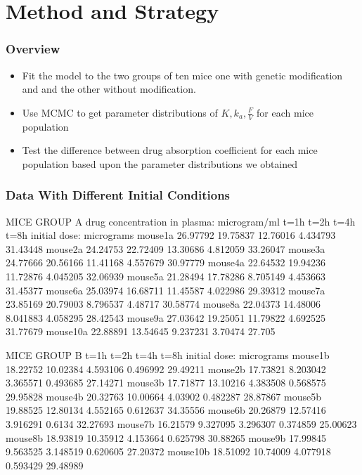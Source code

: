 \documentclass[t]{beamer}
\begin{document}
\section{Method and Strategy}
\begin{frame}[c]
\frametitle{Overview}

\begin{itemize}
\item Fit the model to the two groups of ten mice one with genetic modification and and the other without modification.
\pause
\item Use MCMC to get parameter distributions of  $K, k_{a}, \frac{F}{V}$ for each mice population
\pause
\item Test the difference between drug absorption coefficient for each mice population based upon the parameter distributions we obtained
\end{itemize}
\end{frame}

\begin{frame}[fragile]
  \frametitle{Data With Different Initial Conditions}
\begin{semiverbatim}
{\tiny
MICE GROUP A
drug concentration in plasma: microgram/ml
         t=1h     t=2h     t=4h     t=8h            initial dose: micrograms
mouse1a  26.97792 19.75837 12.76016 4.434793     \alert<2->{   31.43448}
mouse2a  24.24753 22.72409 13.30686 4.812059     \alert<2->{   33.26047}
mouse3a  24.77666 20.56166 11.41168 4.557679     \alert<2->{   30.97779}
mouse4a  22.64532 19.94236 11.72876 4.045205     \alert<2->{   32.06939}
mouse5a  21.28494 17.78286 8.705149 4.453663     \alert<2->{   31.45377}
mouse6a  25.03974 16.68711 11.45587 4.022986     \alert<2->{   29.39312}
mouse7a  23.85169 20.79003 8.796537 4.48717      \alert<2->{   30.58774}
mouse8a  22.04373 14.48006 8.041883 4.058295     \alert<2->{   28.42543}
mouse9a  27.03642 19.25051 11.79822 4.692525     \alert<2->{   31.77679}
mouse10a 22.88891 13.54645 9.237231 3.70474      \alert<2->{   27.705}


MICE GROUP B
        t=1h     t=2h     t=4h     t=8h             initial dose: micrograms  
mouse1b 18.22752 10.02384 4.593106 0.496992      \alert<2->{    29.49211}
mouse2b 17.73821 8.203042 3.365571 0.493685      \alert<2->{    27.14271}
mouse3b 17.71877 13.10216 4.383508 0.568575      \alert<2->{    29.95828}
mouse4b 20.32763 10.00664 4.03902  0.482287      \alert<2->{    28.87867}
mouse5b 19.88525 12.80134 4.552165 0.612637      \alert<2->{    34.35556}
mouse6b 20.26879 12.57416 3.916291 0.6134        \alert<2->{    32.27693}
mouse7b 16.21579 9.327095 3.296307 0.374859      \alert<2->{    25.00623}
mouse8b 18.93819 10.35912 4.153664 0.625798      \alert<2->{    30.88265}
mouse9b 17.99845 9.563525 3.148519 0.620605      \alert<2->{    27.20372}
mouse10b 18.51092 10.74009 4.077918 0.593429     \alert<2->{    29.48989}
}
\end{semiverbatim}
\end{frame}
\end{document}

